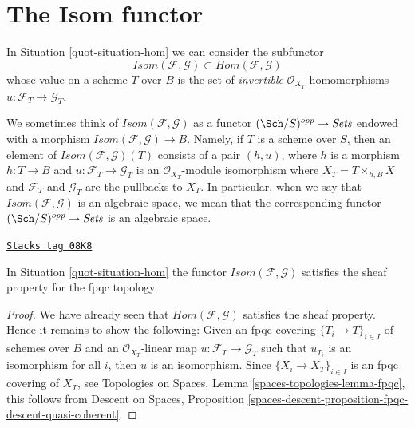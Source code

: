 \section{The Isom functor}
\label{quot-section-isom}
In Situation \ref{quot-situation-hom} we can consider the subfunctor
$$
\mathit{Isom}(\mathcal{F}, \mathcal{G}) \subset
\mathit{Hom}(\mathcal{F}, \mathcal{G})
$$
whose value on a scheme $T$ over $B$ is the set of {\it invertible}
$\mathcal{O}_{X_T}$-homomorphisms $u : \mathcal{F}_T \to \mathcal{G}_T$.

\medskip\noindent
We sometimes think of
$\mathit{Isom}(\mathcal{F}, \mathcal{G})$ as a functor
$(\Sch/S)^{opp} \to \textit{Sets}$
endowed with a morphism
$\mathit{Isom}(\mathcal{F}, \mathcal{G}) \to B$.
Namely, if $T$ is a scheme over $S$, then an element of
$\mathit{Isom}(\mathcal{F}, \mathcal{G})(T)$ consists of a pair
$(h, u)$, where $h$ is a morphism $h : T \to B$ and
$u : \mathcal{F}_T \to \mathcal{G}_T$ is an $\mathcal{O}_{X_T}$-module
isomorphism
where $X_T = T \times_{h, B} X$ and $\mathcal{F}_T$ and $\mathcal{G}_T$
are the pullbacks to $X_T$. In particular, when we say
that $\mathit{Isom}(\mathcal{F}, \mathcal{G})$ is an algebraic space,
we mean that the corresponding functor
$(\Sch/S)^{opp} \to \textit{Sets}$ is an algebraic space.

\begin{lemma}
\label{quot-lemma-isom-sheaf}
\href{https://stacks.math.columbia.edu/tag/08K8}{\texttt{Stacks tag 08K8}}

In Situation \ref{quot-situation-hom} the functor
$\mathit{Isom}(\mathcal{F}, \mathcal{G})$
satisfies the sheaf property for the fpqc topology.
\end{lemma}

\begin{proof}
We have already seen that $\mathit{Hom}(\mathcal{F}, \mathcal{G})$
satisfies the sheaf property. Hence it remains to show the following:
Given an fpqc covering $\{T_i \to T\}_{i \in I}$ of schemes over $B$
and an $\mathcal{O}_{X_T}$-linear map
$u : \mathcal{F}_T \to \mathcal{G}_T$ such that
$u_{T_i}$ is an isomorphism for all $i$, then $u$ is an isomorphism.
Since $\{X_i \to X_T\}_{i \in I}$ is an fpqc covering of $X_T$, see
Topologies on Spaces, Lemma \ref{spaces-topologies-lemma-fpqc},
this follows from
Descent on Spaces, Proposition
\ref{spaces-descent-proposition-fpqc-descent-quasi-coherent}.
\end{proof}

